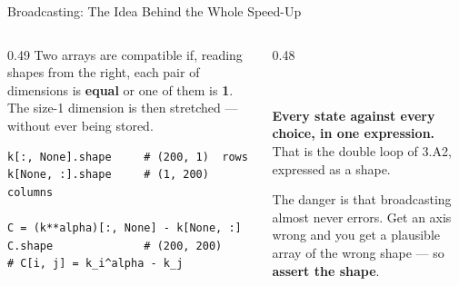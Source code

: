 \begin{frame}[fragile]{Broadcasting: The Idea Behind the Whole Speed-Up}
\begin{columns}[T]
\begin{column}{0.49\textwidth}
\small
Two arrays are compatible if, reading shapes from the right, each pair of dimensions is \textbf{equal} or one of them is \textbf{1}. The size-1 dimension is then stretched --- without ever being stored.
\medskip
\begin{lstlisting}
k[:, None].shape     # (200, 1)  rows
k[None, :].shape     # (1, 200)  columns

C = (k**alpha)[:, None] - k[None, :]
C.shape              # (200, 200)
# C[i, j] = k_i^alpha - k_j
\end{lstlisting}
\end{column}
\begin{column}{0.48\textwidth}
\centering
{}
\\[2mm]
\begin{conceptbox}\footnotesize
\textbf{Every state against every choice, in one expression.} That is the double loop of 3.A2, expressed as a shape.
\end{conceptbox}
\medskip
\begin{cautionbox}\footnotesize
The danger is that broadcasting almost never errors. Get an axis wrong and you get a plausible array of the wrong shape --- so \textbf{assert the shape}.
\end{cautionbox}
\end{column}
\end{columns}
\end{frame}

